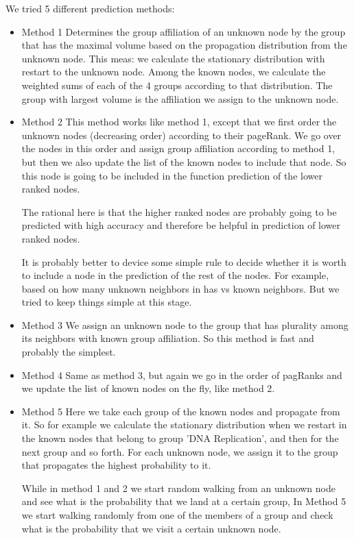 We tried 5 different prediction methods:

\begin{itemize}
\item{Method 1} Determines the group affiliation of an unknown node by the group
that has the maximal volume based on the propagation distribution from the
unknown node. This meas: we calculate the stationary distribution with restart
to the unknown node. Among the known nodes, we calculate the weighted sums of
each of the 4 groups according to that distribution. The group with largest
volume is the affiliation we assign to the unknown node.

\item{Method 2} This method works like method 1, except that we first order the
unknown nodes (decreasing order) according to their pageRank. We go over the
nodes in this order and assign group affiliation according to method 1, but then
we also update the list of the known nodes to include that node. So this node is
going to be included in the function prediction of the lower ranked nodes.

The rational here is that the higher ranked nodes are probably going to be
predicted with high accuracy and therefore be helpful in prediction of lower
ranked nodes. 

It is probably better to device some simple rule to decide whether it is worth
to include a node in the prediction of the rest of the nodes. For example, based
on how many unknown neighbors in has vs known neighbors. But we tried to keep
things simple at this stage.

\item{Method 3} We assign an unknown node to the group that has plurality among
its neighbors with known group affiliation. So this method is fast and
probably the simplest.

\item{Method 4} Same as method 3, but again we go in the order of pagRanks and
we update the list of known nodes on the fly, like method 2.

\item{Method 5} Here we take each group of the known nodes and propagate from
it. So for example we calculate the stationary distribution when we restart in
the known nodes that belong to group 'DNA Replication', and then for the next
group and so forth. For each unknown node, we assign it to the group that
propagates the highest probability to it.

While in method 1 and 2 we start random walking from an unknown node and see
what is the probability that we land at a certain group, In Method 5 we start
walking randomly from one of the members of a group and check what is the
probability that we visit a certain unknown node.


\end{itemize}
